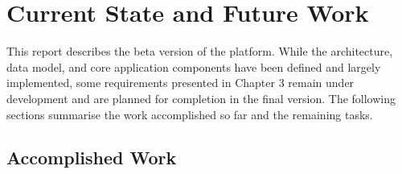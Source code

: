 %
%
\chapter{Current State and Future Work} \label{cap:currentstate}

This report describes the beta version of the platform. While the architecture,
data model, and core application components have been defined and largely
implemented, some requirements presented in Chapter 3 remain under development
and are planned for completion in the final version. The following sections
summarise the work accomplished so far and the remaining tasks.

\section{Accomplished Work} \label{sec:conc_accomplished}

